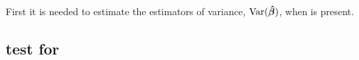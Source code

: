 First it is needed to estimate the estimators of variance, $\operatorname{\text{Var}}(\operatorname{\boldsymbol{\hat{\beta}}})$, when \hetero is present. 


\subsection{test for \hetero}














